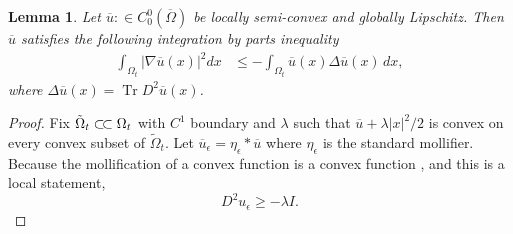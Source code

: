 \documentclass[12pt]{amsart}
\newtheorem{lem}[thm]{Lemma}
\theoremstyle{definition}
\theoremstyle{remark}
\begin{document}
\begin{lem}
  \label{orgc51eab8} Let \(\overline{u} : \in C^0_0(\overline{\Omega})\) be locally semi-convex and globally Lipschitz. Then \(\overline{u}\) satisfies the following integration by parts inequality
  \begin{align}
    \label{eq:ip-ineq} \int_{\Omega_t} |\nabla \overline{u}(x)|^2 dx &\leq -\int_{\Omega_t}
\overline{u}(x) \Delta \overline{u}(x) \, dx,
    \end{align} where $\Delta \overline{u}(x) = \operatorname{Tr} D^{2}\overline{u}(x)$.
\end{lem}
\begin{proof} Fix $\tilde{\Omega}_t \subset\joinrel\subset \Omega_t$ with \(C^{1}\) boundary and $\lambda$ such that $\overline{u}+\lambda|x|^2/2$ is convex on every convex subset of $\tilde{\Omega}_t$. Let $\overline{u}_{\epsilon} = \eta_\epsilon \ast \overline{u}$ where $\eta_\epsilon$ is the standard mollifier. Because the mollification of a convex function is a convex function \cite[Proof of Theorem 6.7]{zbMATH08010281}, and this is a local statement,
  \begin{equation}
    \label{eq:moll-2deriv-bound-below}
    D^2u_\epsilon \geq -\lambda I.
  \end{equation}


\end{proof}
\end{document}

